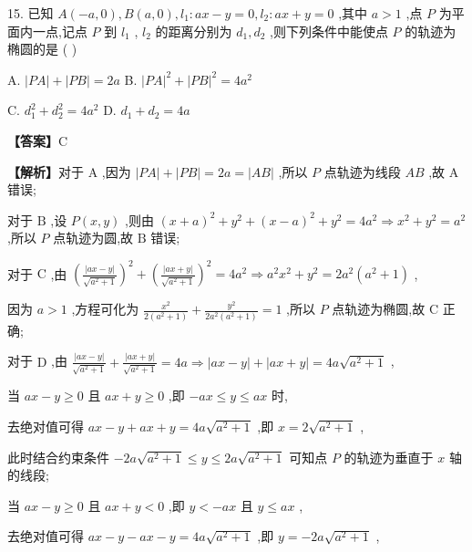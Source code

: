 \documentclass[10pt]{article}
\newcommand*\circled[1]{\tikz[baseline=(char.base)]{\node[shape=circle,draw,inner sep=1.5pt] (char) {\small #1};}}
\begin{document}
15. 已知 \(A\left( {-a,0}\right) ,B\left( {a,0}\right) ,{l}_{1} : {ax} - y = 0,{l}_{2} : {ax} + y = 0\) ,其中 \(a > 1\) ,点 \(P\) 为平面内一点,记点 \(P\) 到 \({l}_{1}\) , \({l}_{2}\) 的距离分别为 \({d}_{1},{d}_{2}\) ,则下列条件中能使点 \(P\) 的轨迹为椭圆的是 ( )

A. \(\left| {PA}\right|  + \left| {PB}\right|  = {2a}\) B. \({\left| PA\right| }^{2} + {\left| PB\right| }^{2} = 4{a}^{2}\)

C. \({d}_{1}^{2} + {d}_{2}^{2} = 4{a}^{2}\) D. \({d}_{1} + {d}_{2} = {4a}\)

\textbf{【答案】}C

\textbf{【解析】}对于 \(\mathrm{A}\) ,因为 \(\left| {PA}\right|  + \left| {PB}\right|  = {2a} = \left| {AB}\right|\) ,所以 \(P\) 点轨迹为线段 \({AB}\) ,故 \(\mathrm{A}\) 错误;

对于 \(\mathrm{B}\) ,设 \(P\left( {x,y}\right)\) ,则由 \({\left( x + a\right) }^{2} + {y}^{2} + {\left( x - a\right) }^{2} + {y}^{2} = 4{a}^{2} \Rightarrow  {x}^{2} + {y}^{2} = {a}^{2}\) ,所以 \(P\) 点轨迹为圆,故 \(\mathrm{B}\) 错误;

对于 \(\mathrm{C}\) ,由 \({\left( \frac{\left| ax - y\right| }{\sqrt{{a}^{2} + 1}}\right) }^{2} + {\left( \frac{\left| ax + y\right| }{\sqrt{{a}^{2} + 1}}\right) }^{2} = 4{a}^{2} \Rightarrow  {a}^{2}{x}^{2} + {y}^{2} = 2{a}^{2}\left( {{a}^{2} + 1}\right)\) ,

因为 \(a > 1\) ,方程可化为 \(\frac{{x}^{2}}{2\left( {{a}^{2} + 1}\right) } + \frac{{y}^{2}}{2{a}^{2}\left( {{a}^{2} + 1}\right) } = 1\) ,所以 \(P\) 点轨迹为椭圆,故 \(\mathrm{C}\) 正确;

对于 \(\mathrm{D}\) ,由 \(\frac{\left| ax - y\right| }{\sqrt{{a}^{2} + 1}} + \frac{\left| ax + y\right| }{\sqrt{{a}^{2} + 1}} = {4a} \Rightarrow  \left| {{ax} - y}\right|  + \left| {{ax} + y}\right|  = {4a}\sqrt{{a}^{2} + 1}\) ,

\circled{1}  当 \({ax} - y \geq  0\) 且 \({ax} + y \geq  0\) ,即 \(- {ax} \leq  y \leq  {ax}\) 时,

去绝对值可得 \({ax} - y + {ax} + y = {4a}\sqrt{{a}^{2} + 1}\) ,即 \(x = 2\sqrt{{a}^{2} + 1}\) ,

此时结合约束条件 \(- {2a}\sqrt{{a}^{2} + 1} \leq  y \leq  {2a}\sqrt{{a}^{2} + 1}\) 可知点 \(P\) 的轨迹为垂直于 \(x\) 轴的线段;

\circled{2}  当 \({ax} - y \geq  0\) 且 \({ax} + y < 0\) ,即 \(y <  - {ax}\) 且 \(y \leq  {ax}\) ,

去绝对值可得 \({ax} - y - {ax} - y = {4a}\sqrt{{a}^{2} + 1}\) ,即 \(y =  - {2a}\sqrt{{a}^{2} + 1}\) ,
\end{document}
